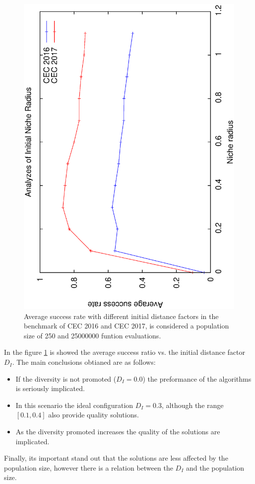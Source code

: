\begin{figure}[t]
\centering
  \includegraphics[scale=0.3, angle=-90]{img/Tuning_CEC.eps}
\caption{Average success rate with different initial distance factors in the benchmark of CEC 2016 and CEC 2017, is considered a population size of 250 and 25000000 funtion evaluations.}
\label{fig:one}
\end{figure}

In the figure \ref{fig:one} is showed the average success ratio vs. the initial distance factor $D_I$.
%
The main conclusions obtianed are as follows:
\begin{itemize}
\item If the diversity is not promoted ($D_I = 0.0 $) the preformance of the algorithms is seriously implicated.
\item In this scenario the ideal configuration $D_I=0.3$, although the range $[0.1, 0.4]$ also provide quality solutions.
\item As the diversity promoted increases the quality of the solutions are implicated.
\end{itemize}

Finally, its important stand out that the solutions are less affected by the population size, however there is a relation between the $D_I$ and the population size.
%


